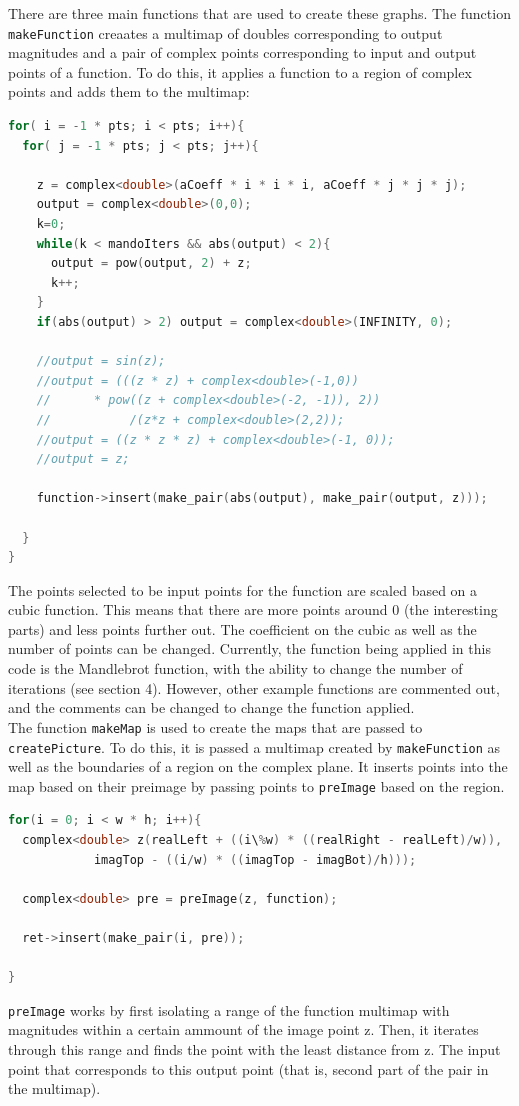 \documentclass[letterpaper,12pt]{article}
\begin{document}
There are three main functions that are used to create these graphs. The function \verb|makeFunction| creaates a multimap of doubles corresponding to output magnitudes and a pair of complex points corresponding to input and output points of a function. To do this, it applies a function to a region of complex points and adds them to the multimap:
\begin{lstlisting}[language=c++]
for( i = -1 * pts; i < pts; i++){
  for( j = -1 * pts; j < pts; j++){

    z = complex<double>(aCoeff * i * i * i, aCoeff * j * j * j);
    output = complex<double>(0,0);
    k=0;
    while(k < mandoIters && abs(output) < 2){
      output = pow(output, 2) + z;
      k++;
    }
    if(abs(output) > 2) output = complex<double>(INFINITY, 0);

    //output = sin(z);
    //output = (((z * z) + complex<double>(-1,0))
    //		* pow((z + complex<double>(-2, -1)), 2))
    //           /(z*z + complex<double>(2,2));
    //output = ((z * z * z) + complex<double>(-1, 0));
    //output = z;

    function->insert(make_pair(abs(output), make_pair(output, z)));

  }
}
\end{lstlisting}
The points selected to be input points for the function are scaled based on a cubic function.
This means that there are more points around 0 (the interesting parts) and less points further out.
The coefficient on the cubic as well as the number of points can be changed.
Currently, the function being applied in this code is the Mandlebrot function, with the ability to change the number of iterations (see section 4).
However, other example functions are commented out, and the comments can be changed to change the function applied. \\

The function \verb|makeMap| is used to create the maps that are passed to \verb|createPicture|.
To do this, it is passed a multimap created by \verb|makeFunction| as well as the boundaries of a region on the complex plane.
It inserts points into the map based on their preimage by passing points to \verb|preImage| based on the region.
\begin{lstlisting}[language=c++]
for(i = 0; i < w * h; i++){
  complex<double> z(realLeft + ((i\%w) * ((realRight - realLeft)/w)),
			imagTop - ((i/w) * ((imagTop - imagBot)/h)));

  complex<double> pre = preImage(z, function);

  ret->insert(make_pair(i, pre));

}
\end{lstlisting}
\verb|preImage| works by first isolating a range of the function multimap with magnitudes within a certain ammount of the image point z.
Then, it iterates through this range and finds the point with the least distance from z.
The input point that corresponds to this output point (that is, second part of the pair in the multimap).
\end{document}
